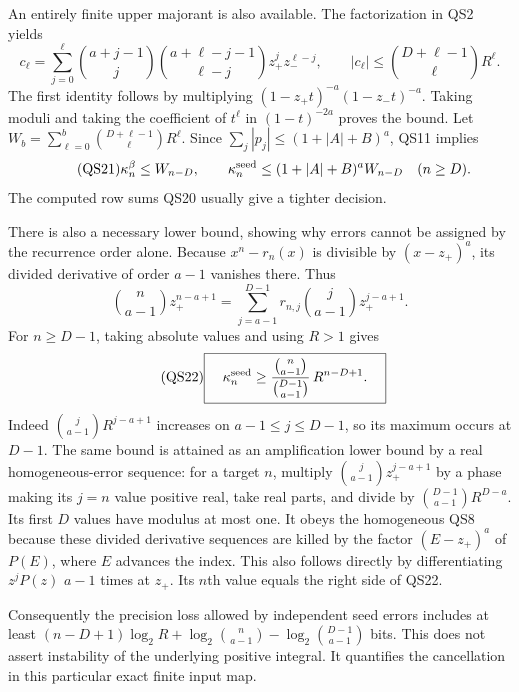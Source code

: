 \documentclass[11pt]{article}
\begin{document}
An entirely finite upper majorant is also available.
The factorization in QS2 yields
\[
 c_\ell=\sum_{j=0}^{\ell}
 \binom{a+j-1}{j}\binom{a+\ell-j-1}{\ell-j}
                       z_+^jz_-^{\ell-j},
 \qquad
 |c_\ell|\le\binom{D+\ell-1}{\ell}R^\ell .
\]
The first identity follows by multiplying
\((1-z_+t)^{-a}(1-z_-t)^{-a}\).
Taking moduli and taking the coefficient of \(t^\ell\)
in \((1-t)^{-2a}\) proves the bound.
Let \(W_b=\sum_{\ell=0}^b\binom{D+\ell-1}{\ell}R^\ell\).
Since \(\sum_j|p_j|\le(1+|A|+B)^a\), QS11 implies
\begin{equation}\tag{QS21}
 \kappa_n^\beta\le W_{n-D},\qquad
 \kappa_n^{\rm seed}\le (1+|A|+B)^a W_{n-D}
                                      \quad(n\ge D).
\end{equation}
The computed row sums QS20 usually give a tighter decision.

There is also a necessary lower bound, showing why errors
cannot be assigned by the recurrence order alone.
Because \(x^n-r_n(x)\) is divisible by \((x-z_+)^a\),
its divided derivative of order \(a-1\) vanishes there.
Thus
\[
 \binom n{a-1}z_+^{n-a+1}
 =\sum_{j=a-1}^{D-1}r_{n,j}
                      \binom j{a-1}z_+^{j-a+1}.
\]
For \(n\ge D-1\), taking absolute values and using \(R>1\)
gives
\begin{equation}\tag{QS22}
 \boxed{\quad
 \kappa_n^{\rm seed}\ge
   \frac{\binom n{a-1}}{\binom{D-1}{a-1}}\,
                                  R^{n-D+1}.\quad}
\end{equation}
Indeed \(\binom j{a-1}R^{j-a+1}\) increases on
\(a-1\le j\le D-1\), so its maximum occurs at \(D-1\).
The same bound is attained as an amplification lower bound
by a real homogeneous-error sequence: for a target \(n\),
multiply \(\binom j{a-1}z_+^{j-a+1}\) by a phase making its
\(j=n\) value positive real, take real parts, and divide
by \(\binom{D-1}{a-1}R^{D-a}\).
Its first \(D\) values have modulus at most one. It obeys
the homogeneous QS8 because these divided derivative
sequences are killed by the factor \((E-z_+)^a\) of
\(P(E)\), where \(E\) advances the index. This also follows
directly by differentiating \(z^jP(z)\) \(a-1\) times at \(z_+\).
Its \(n\)th value equals the right side of QS22.

Consequently the precision loss allowed by independent seed
errors includes at least
\((n-D+1)\log_2R+
\log_2\binom n{a-1}-\log_2\binom{D-1}{a-1}\) bits.
This does not assert instability of the underlying positive
integral. It quantifies the cancellation in this particular
exact finite input map.
\end{document}
